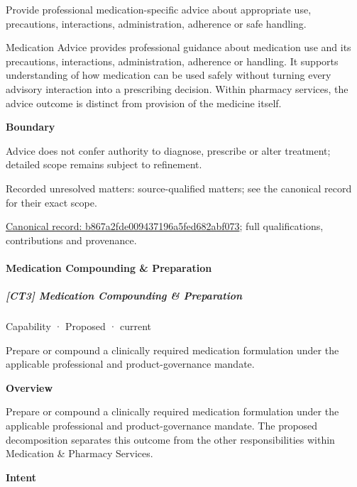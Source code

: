 Provide professional medication-specific advice about appropriate use, precautions, interactions, administration, adherence or safe handling.



Medication Advice provides professional guidance about medication use and its precautions, interactions, administration, adherence or handling. It supports understanding of how medication can be used safely without turning every advisory interaction into a prescribing decision. Within pharmacy services, the advice outcome is distinct from provision of the medicine itself.



\textbf{Boundary}



Advice does not confer authority to diagnose, prescribe or alter treatment; detailed scope remains subject to refinement.


{\small Recorded unresolved matters: source-qualified matters; see the canonical record for their exact scope.}\par
{\footnotesize \href{../../../../continuum/strategy/capability/b867a2fde009437196a5fed682abf073.md}{Canonical record: b867a2fde009437196a5fed682abf073}; full qualifications, contributions and provenance.}\par
\paragraph{Medication Compounding \& Preparation}

\subparagraph{[CT3] Medication Compounding \& Preparation}

\label{element:07380933da66427c865ca8e64d414e59}
{\small Capability · Proposed · current}\par

Prepare or compound a clinically required medication formulation under the applicable professional and product-governance mandate.



\textbf{Overview}



Prepare or compound a clinically required medication formulation under the applicable professional and product-governance mandate. The proposed decomposition separates this outcome from the other responsibilities within Medication \& Pharmacy Services.



\textbf{Intent}



